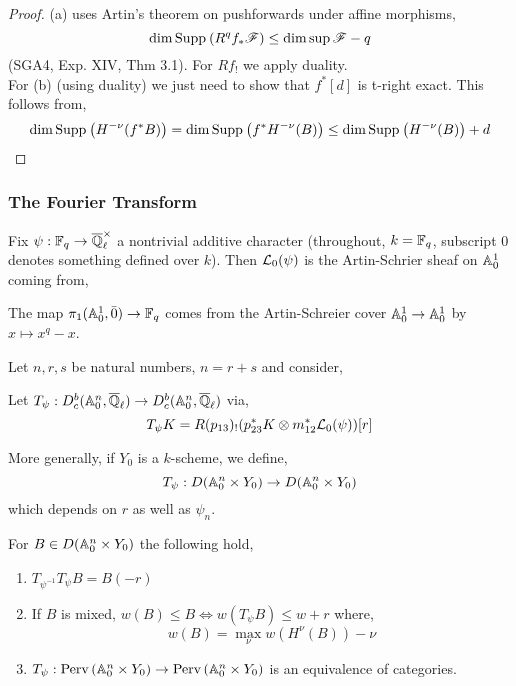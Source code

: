 \documentclass[12pt]{article}
\begin{document}
\begin{proof}
(a) uses Artin's theorem on pushforwards under affine morphisms,
\[ \dim{\mathrm{Supp}_{} \left( R^q f_* \mathscr{F}\right) } \le \dim{\sup{}{\mathscr{F}}} - q \]
(SGA4, Exp. XIV, Thm 3.1). For $R f_!$ we apply duality. 
\bigskip\\
For (b) (using duality) we just need to show that $f^*[d]$ is t-right exact. This follows from,
\[ \dim{\mathrm{Supp}_{} \left( H^{-\nu}(f^* B) \right) } = \dim \mathrm{Supp}_{} \left( f^* H^{-\nu}(B) \right) \le \dim{\mathrm{Supp}_{} \left( H^{-\nu}(B) \right) } + d \]
\end{proof}

\subsubsection{The Fourier Transform}

Fix $\psi : \mathbb{F}_q \to \overline{\mathbb{Q}}_\ell^\times$ a nontrivial additive character (throughout, $k = \mathbb{F}_q$, subscript 0 denotes something defined over $k$). Then $\mathcal{L}_0(\psi)$ is the Artin-Schrier sheaf on $\mathbb{A}^1_0$ coming from,
\begin{center}
\end{center}

\begin{rmk}
The map $\pi_1(\mathbb{A}^1_0, \bar{0}) \to \mathbb{F}_q$ comes from the Artin-Schreier cover $\mathbb{A}^1_0 \to \mathbb{A}^1_0$ by $x \mapsto x^q - x$. 
\end{rmk}
\noindent
Let $n,r,s$ be natural numbers, $n = r + s$ and consider,
\begin{center}
\end{center}

\begin{defn}
Let $T_\psi : D^b_c(\mathbb{A}^n_0, \overline{\mathbb{Q}}_\ell) \to D^b_c(\mathbb{A}^n_0, \overline{\mathbb{Q}}_\ell)$ via,
\[ T_\psi K = R(p_{13})_! (p_{23}^* K \otimes m_{12}^* \mathcal{L}_0(\psi))[r] \]
\end{defn}
More generally, if $Y_0$ is a $k$-scheme, we define,
\[ T_\psi : D(\mathbb{A}^n_0 \times Y_0) \to D(\mathbb{A}^n_0 \times Y_0) \]
which depends on $r$ as well as $\psi_n$.

\begin{thm}
For $B \in D(\mathbb{A}^n_0 \times Y_0)$ the following hold,
\begin{enumerate}
\item $T_{\psi^{-1}} T_{\psi} B = B(-r)$
\item If $B$ is mixed, $w(B) \le B \iff w(T_\psi B) \le w + r$ where,
\[ w(B) = \max_{\nu} w(H^\nu(B)) - \nu \]
\item $T_\psi : \mathrm{Perv}\left( \mathbb{A}_0^n \times Y_0 \right) \to \mathrm{Perv}\left( \mathbb{A}^n_0 \times Y_0 \right)$ is an equivalence of categories. 
\end{enumerate}
\end{thm}
\end{document}
